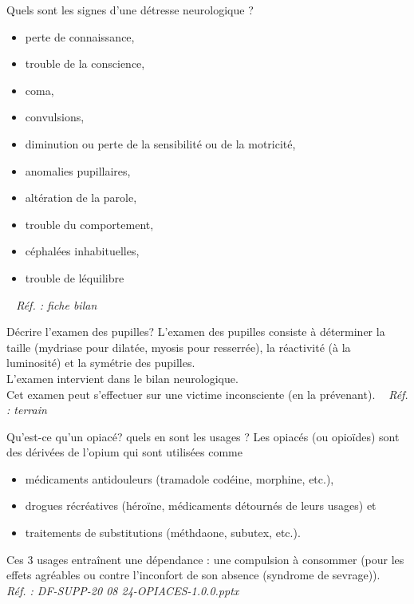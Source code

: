 \documentclass[grid,avery5371,landscape]{flashcards}
\makeatletter
\newcounter{nocarte}
\newcommand{\categ}[1]{%
  \def\@categ{#1}%
  \setcounter{nocarte}{0}%
}
\newcommand{\source}[1]{%
  \medskip
  \itshape%
   ~ \hfill Réf. : #1}
\makeatother
\begin{document}
\color[HTML]{FF6D01}
\categ{PSE+}
\begin{flashcard}[bilan]{
 Quels sont les signes d'une détresse neurologique ?   }
  \begin{itemize}
        \item perte de connaissance, 
        \item trouble de la conscience, 
        \item coma, 
        \item convulsions, 
        \item diminution ou perte de la sensibilité ou de la motricité, 
        \item anomalies pupillaires, 
        \item altération de la parole, 
        \item trouble du comportement, 
        \item céphalées inhabituelles, 
        \item trouble de léquilibre
    \end{itemize}
  \source{fiche bilan}
\end{flashcard}


\color[HTML]{FF6D01}
\categ{PSE+}
\begin{flashcard}[geste]{
 Décrire l'examen des pupilles?   }
  L'examen des pupilles consiste à déterminer la taille (mydriase pour dilatée, myosis pour resserrée), la réactivité (à la luminosité) et la symétrie des pupilles.\\
   L'examen intervient dans le bilan neurologique. \\
   Cet examen peut s'effectuer sur une victime inconsciente (en la prévenant).
  \source{terrain}
\end{flashcard}


\color[HTML]{FF6D01}
\categ{PSE+}
\begin{flashcard}[bilan]{
 Qu'est-ce qu'un opiacé? quels en sont les usages ?   }
  Les opiacés (ou opioïdes) sont des dérivées de l'opium qui sont utilisées comme 
   \begin{itemize}
       \item médicaments antidouleurs (tramadole codéine, morphine, etc.),
       \item drogues récréatives (héroïne, médicaments détournés de leurs usages) et 
       \item traitements de substitutions (méthdaone, subutex, etc.).
   \end{itemize} 
   Ces 3 usages entraînent une dépendance : une compulsion à consommer (pour les effets agréables ou contre l'inconfort de son absence (syndrome de sevrage)).
  \source{DF-SUPP-20 08 24-OPIACES-1.0.0.pptx }
\end{flashcard}
\end{document}
